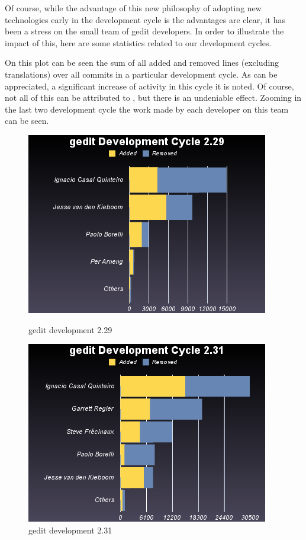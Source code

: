 Of course, while the advantage of this new philosophy of adopting new technologies early in the development cycle is the advantages are clear, 
it has been a stress on the small team of gedit developers.   In order to illustrate the impact of this, here are some statistics related to 
our development cycles.


On this plot can be seen the sum of all added and removed lines (excluding translations) over all commits in a particular development cycle. As can be appreciated, a significant increase of activity in this cycle it is noted. Of course, not all of this can be attributed to , but there is an undeniable effect.   Zooming in the last two development cycle the work made by each developer on this team can be seen.

\begin{figure}[H]
  \begin{minipage}[b]{0.5\linewidth}
    \centering
    \includegraphics[scale=0.45]{./images/gedit-development-2-29}
    \caption{gedit development 2.29}
  \end{minipage}
  \hspace{0.5cm}
  \begin{minipage}[b]{0.5\linewidth}
    \centering
    \includegraphics[scale=0.45]{./images/gedit-development-2-31}
    \caption{gedit development 2.31}
  \end{minipage}
\end{figure}

